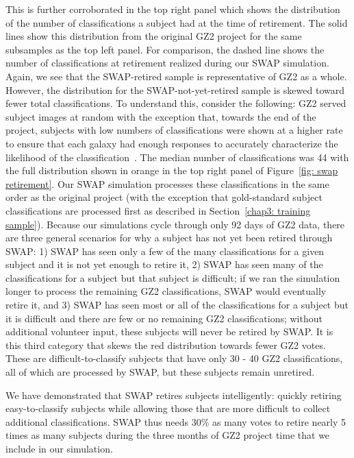  This is further corroborated in the top right panel which shows the distribution of the number of classifications a subject had at the time of retirement. The solid lines show this distribution from the original GZ2 project for the same subsamples as the top left panel. For comparison, the dashed line shows the number of classifications at retirement realized during our SWAP simulation. Again, we see that the SWAP-retired sample is representative of GZ2 as a whole. However, the distribution for the SWAP-not-yet-retired sample is skewed toward fewer total classifications. To understand this, consider the following: GZ2 served subject images at random with the  exception that, towards the end of the project, subjects with low numbers of classifications were shown at a higher rate to ensure that each galaxy had enough responses to accurately characterize the likelihood of the classification~\citep{Willett2013}. The median number of classifications was 44 with the full distribution shown in orange in the top right panel of Figure~\ref{fig: swap retirement}. Our SWAP simulation processes these classifications in the same order as the original project (with the exception that gold-standard subject classifications are processed first as described in Section~\ref{chap3: training sample}). Because our simulations cycle through only 92 days of GZ2 data, there are three general scenarios for why a subject has not yet been retired through SWAP: 1) SWAP has seen only a few of the many classifications for a given subject and it is not yet enough to retire it, 2) SWAP has seen many of the classifications for a subject but that subject is difficult; if we ran the simulation longer to process the remaining GZ2 classifications, SWAP would eventually retire it, and 3) SWAP has seen most or all of the classifications for a subject but it is difficult and there are few or no remaining GZ2 classifications; without additional volunteer input, these subjects will never be retired by SWAP. It is this third category that skews the red distribution towards fewer GZ2 votes. These are difficult-to-classify subjects that have only 30 - 40 GZ2 classifications, all of which are processed by SWAP, but these subjects remain unretired.

We have demonstrated that SWAP retires subjects intelligently: quickly retiring easy-to-classify subjects while allowing those that are more difficult to collect additional classifications. SWAP thus needs 30\% as many votes to retire nearly 5 times as many subjects during the three months of GZ2 project time that we include in our simulation.



